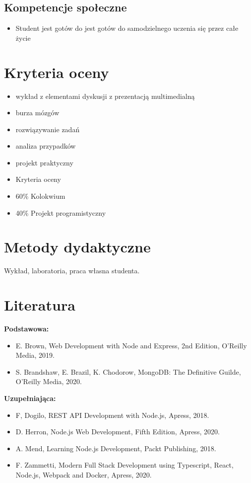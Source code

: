 \documentclass[12pt, a4paper]{article}
\begin{document}
\subsection*{Kompetencje społeczne}
\begin{itemize}
  \item Student jest gotów do jest gotów do samodzielnego uczenia się przez całe życie
\end{itemize}

\section{Kryteria oceny}

\begin{itemize}
  \item wykład z elementami dyskusji z prezentacją multimedialną
  \item burza mózgów
  \item rozwiązywanie zadań
  \item analiza przypadków
  \item projekt praktyczny
  \item Kryteria oceny
  \item 60\% Kolokwium
  \item 40\% Projekt programistyczny
\end{itemize}

\section{Metody dydaktyczne}

Wykład, laboratoria, praca własna studenta.

\section{Literatura}

\textbf{Podstawowa:}
\begin{itemize}
  \item E. Brown, Web Development with Node and Express, 2nd Edition, O’Reilly Media, 2019.
  \item S. Brandshaw, E. Brazil, K. Chodorow, MongoDB: The Definitive Guilde, O’Reilly Media, 2020.
\end{itemize}

\textbf{Uzupełniająca:}
\begin{itemize}
  \item F, Dogilo, REST API Development with Node.js, Apress, 2018.
  \item D. Herron, Node.js Web Development, Fifth Edition, Apress, 2020.
  \item A. Mend, Learning Node.js Development, Packt Publishing, 2018.
  \item F. Zammetti, Modern Full Stack Development using Typescript, React, Node.js, Webpack and Docker, Apress, 2020.
\end{itemize}
\end{document}

